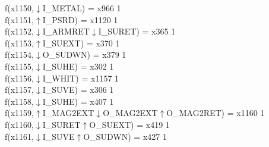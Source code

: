 f(x1150,$\downarrow$I\_METAL) = x966 {1} \\
f(x1151,$\uparrow$I\_PSRD) = x1120 {1} \\
f(x1152,$\downarrow$I\_ARMRET$\downarrow$I\_SURET) = x365 {1} \\
f(x1153,$\uparrow$I\_SUEXT) = x370 {1} \\
f(x1154,$\downarrow$O\_SUDWN) = x379 {1} \\
f(x1155,$\downarrow$I\_SUHE) = x302 {1} \\
f(x1156,$\downarrow$I\_WHIT) = x1157 {1} \\
f(x1157,$\downarrow$I\_SUVE) = x306 {1} \\
f(x1158,$\downarrow$I\_SUHE) = x407 {1} \\
f(x1159,$\uparrow$I\_MAG2EXT$\downarrow$O\_MAG2EXT$\uparrow$O\_MAG2RET) = x1160 {1} \\
f(x1160,$\downarrow$I\_SURET$\uparrow$O\_SUEXT) = x419 {1} \\
f(x1161,$\downarrow$I\_SUVE$\uparrow$O\_SUDWN) = x427 {1} \\

